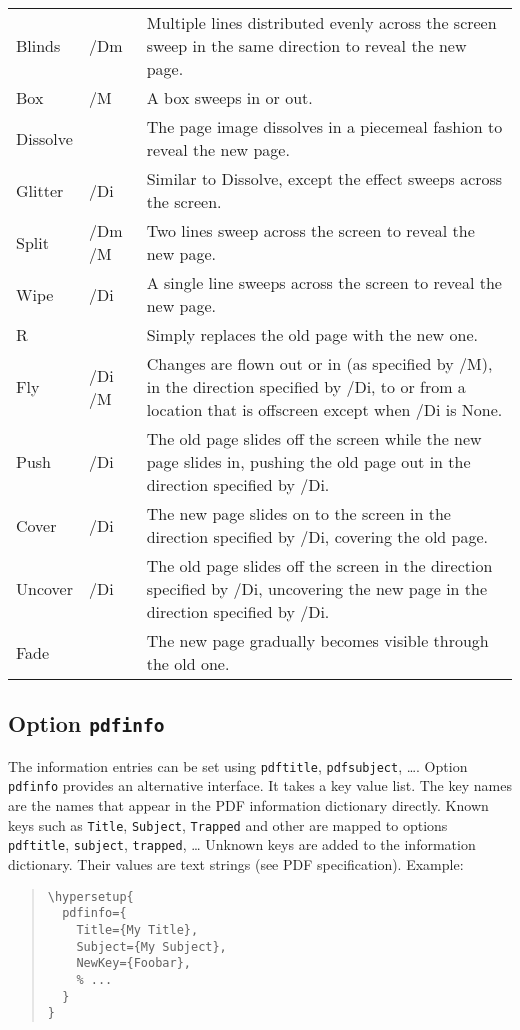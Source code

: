 \documentclass{article}
\begin{document}
\begin{longtable}{@{}>{\ttfamily}llp{8.5cm}@{}}
Blinds   & /Dm    & Multiple lines distributed evenly across the screen sweep in the same direction to reveal the new
                    page. \\
Box      & /M     & A box sweeps in or out. \\
Dissolve &        & The page image dissolves in a piecemeal fashion to reveal the new page. \\
Glitter  & /Di    & Similar to Dissolve, except the effect sweeps across the screen. \\
Split    & /Dm /M & Two lines sweep across the screen to reveal the new page. \\
Wipe     & /Di    & A single line sweeps across the screen to reveal the new page. \\
R        &        & Simply replaces the old page with the new one. \\
Fly      & /Di /M & Changes are flown out or in (as specified by /M), in the direction
                    specified by /Di, to or from a location that is
                    offscreen except when /Di is None. \\
Push     & /Di    & The old page slides off the screen while the new page slides in,
                    pushing the old page out in the direction
                    specified by /Di. \\
Cover    & /Di    & The new page slides on to the screen in the direction specified
                    by /Di, covering the old page. \\
Uncover  & /Di    & The old page slides off the screen in the direction specified by
                    /Di, uncovering the new page in the direction
                    specified by /Di. \\
Fade     &        & The new page gradually becomes visible through the old one.

\end{longtable}

\subsection{Option \texttt{pdfinfo}}

The information entries can be set using \texttt{pdftitle},
\texttt{pdfsubject}, \dots. Option \texttt{pdfinfo} provides an alternative
interface. It takes a key value list. The key names are the names that
appear in the PDF information dictionary directly. Known keys such as
\texttt{Title}, \texttt{Subject}, \texttt{Trapped} and other are mapped to
options \texttt{pdftitle}, \texttt{subject}, \texttt{trapped}, \dots
Unknown keys are added to the information dictionary. Their values are text
strings (see PDF specification).
Example:
\begin{quote}
\begin{verbatim}
\hypersetup{
  pdfinfo={
    Title={My Title},
    Subject={My Subject},
    NewKey={Foobar},
    % ...
  }
}
\end{verbatim}
\end{quote}
\end{document}
